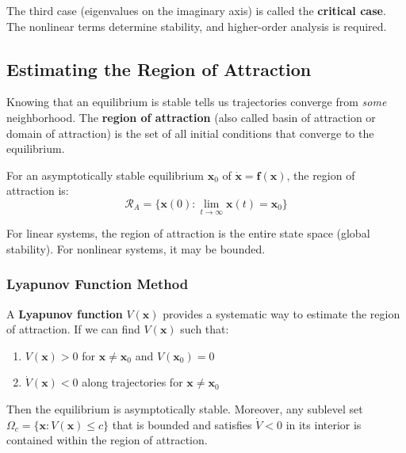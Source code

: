 The third case (eigenvalues on the imaginary axis) is called the \textbf{critical case}. The nonlinear terms determine stability, and higher-order analysis is required.

\subsection{Estimating the Region of Attraction}

Knowing that an equilibrium is stable tells us trajectories converge from \textit{some} neighborhood. The \textbf{region of attraction} (also called basin of attraction or domain of attraction) is the set of all initial conditions that converge to the equilibrium.

\begin{definition}
For an asymptotically stable equilibrium $\mathbf{x}_0$ of $\dot{\mathbf{x}} = \mathbf{f}(\mathbf{x})$, the region of attraction is:
\begin{equation}
\mathcal{R}_A = \{\mathbf{x}(0) : \lim_{t \to \infty} \mathbf{x}(t) = \mathbf{x}_0\}
\end{equation}
\end{definition}

For linear systems, the region of attraction is the entire state space (global stability). For nonlinear systems, it may be bounded.

\subsubsection{Lyapunov Function Method}

A \textbf{Lyapunov function} $V(\mathbf{x})$ provides a systematic way to estimate the region of attraction. If we can find $V(\mathbf{x})$ such that:
\begin{enumerate}
    \item $V(\mathbf{x}) > 0$ for $\mathbf{x} \neq \mathbf{x}_0$ and $V(\mathbf{x}_0) = 0$
    \item $\dot{V}(\mathbf{x}) < 0$ along trajectories for $\mathbf{x} \neq \mathbf{x}_0$
\end{enumerate}

Then the equilibrium is asymptotically stable. Moreover, any sublevel set $\Omega_c = \{\mathbf{x} : V(\mathbf{x}) \leq c\}$ that is bounded and satisfies $\dot{V} < 0$ in its interior is contained within the region of attraction.

